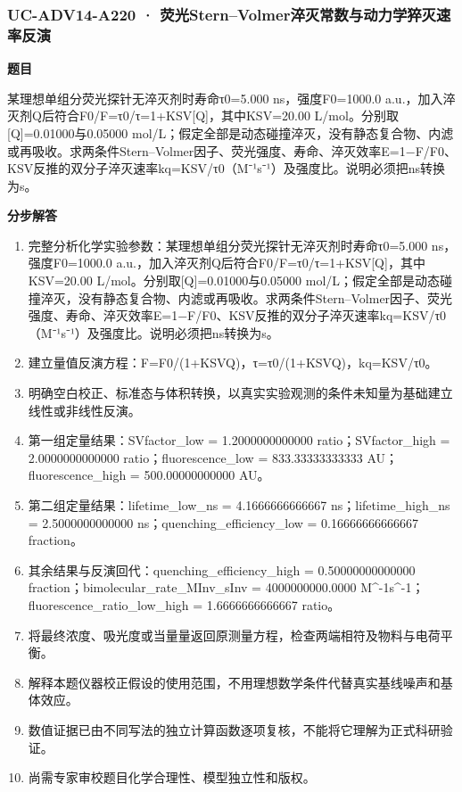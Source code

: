 \documentclass[UTF8,11pt,a4paper]{ctexart}
\begin{document}
\subsubsection*{UC-ADV14-A220 · 荧光Stern–Volmer淬灭常数与动力学猝灭速率反演}
\noindent\textbf{题目}\par
某理想单组分荧光探针无淬灭剂时寿命τ0=5.000 ns，强度F0=1000.0 a.u.，加入淬灭剂Q后符合F0/F=τ0/τ=1+KSV[Q]，其中KSV=20.00 L/mol。分别取[Q]=0.01000与0.05000 mol/L；假定全部是动态碰撞淬灭，没有静态复合物、内滤或再吸收。求两条件Stern–Volmer因子、荧光强度、寿命、淬灭效率E=1−F/F0、KSV反推的双分子淬灭速率kq=KSV/τ0（M⁻¹s⁻¹）及强度比。说明必须把ns转换为s。\par
\medskip\noindent\textbf{分步解答}
\begin{enumerate}
\item 完整分析化学实验参数：某理想单组分荧光探针无淬灭剂时寿命τ0=5.000 ns，强度F0=1000.0 a.u.，加入淬灭剂Q后符合F0/F=τ0/τ=1+KSV[Q]，其中KSV=20.00 L/mol。分别取[Q]=0.01000与0.05000 mol/L；假定全部是动态碰撞淬灭，没有静态复合物、内滤或再吸收。求两条件Stern–Volmer因子、荧光强度、寿命、淬灭效率E=1−F/F0、KSV反推的双分子淬灭速率kq=KSV/τ0（M⁻¹s⁻¹）及强度比。说明必须把ns转换为s。
\item 建立量值反演方程：F=F0/(1+KSVQ)，τ=τ0/(1+KSVQ)，kq=KSV/τ0。
\item 明确空白校正、标准态与体积转换，以真实实验观测的条件未知量为基础建立线性或非线性反演。
\item 第一组定量结果：SVfactor\_low = 1.2000000000000 ratio；SVfactor\_high = 2.0000000000000 ratio；fluorescence\_low = 833.33333333333 AU；fluorescence\_high = 500.00000000000 AU。
\item 第二组定量结果：lifetime\_low\_ns = 4.1666666666667 ns；lifetime\_high\_ns = 2.5000000000000 ns；quenching\_efficiency\_low = 0.16666666666667 fraction。
\item 其余结果与反演回代：quenching\_efficiency\_high = 0.50000000000000 fraction；bimolecular\_rate\_MInv\_sInv = 4000000000.0000 M\textasciicircum{}-1s\textasciicircum{}-1；fluorescence\_ratio\_low\_high = 1.6666666666667 ratio。
\item 将最终浓度、吸光度或当量量返回原测量方程，检查两端相符及物料与电荷平衡。
\item 解释本题仪器校正假设的使用范围，不用理想数学条件代替真实基线噪声和基体效应。
\item 数值证据已由不同写法的独立计算函数逐项复核，不能将它理解为正式科研验证。
\item 尚需专家审校题目化学合理性、模型独立性和版权。
\end{enumerate}
\end{document}
